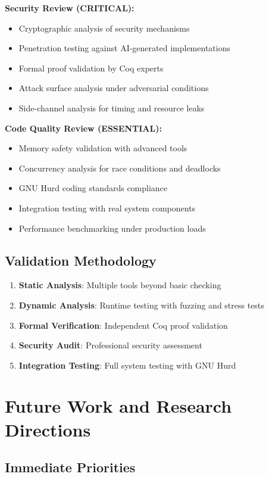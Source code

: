 \documentclass[11pt,a4paper]{article}
\begin{document}
\textbf{Security Review (CRITICAL):}
\begin{itemize}
    \item Cryptographic analysis of security mechanisms
    \item Penetration testing against AI-generated implementations
    \item Formal proof validation by Coq experts
    \item Attack surface analysis under adversarial conditions
    \item Side-channel analysis for timing and resource leaks
\end{itemize}

\textbf{Code Quality Review (ESSENTIAL):}
\begin{itemize}
    \item Memory safety validation with advanced tools
    \item Concurrency analysis for race conditions and deadlocks
    \item GNU Hurd coding standards compliance
    \item Integration testing with real system components
    \item Performance benchmarking under production loads
\end{itemize}

\subsection{Validation Methodology}

\begin{enumerate}
    \item \textbf{Static Analysis}: Multiple tools beyond basic checking
    \item \textbf{Dynamic Analysis}: Runtime testing with fuzzing and stress tests
    \item \textbf{Formal Verification}: Independent Coq proof validation
    \item \textbf{Security Audit}: Professional security assessment
    \item \textbf{Integration Testing}: Full system testing with GNU Hurd
\end{enumerate}

\section{Future Work and Research Directions}

\subsection{Immediate Priorities}
\end{document}
